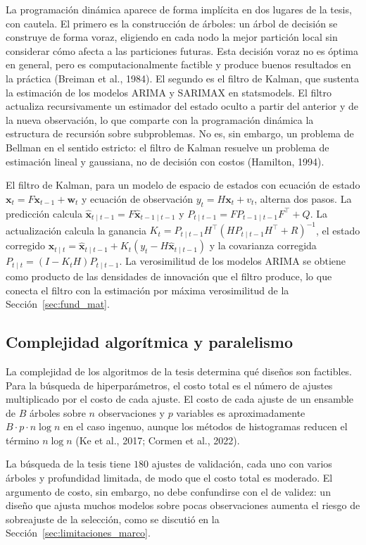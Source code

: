 La programación dinámica aparece de forma implícita en dos lugares de la tesis, con cautela. El primero es la construcción de árboles: un árbol de decisión se construye de forma voraz, eligiendo en cada nodo la mejor partición local sin considerar cómo afecta a las particiones futuras. Esta decisión voraz no es óptima en general, pero es computacionalmente factible y produce buenos resultados en la práctica (Breiman et al., 1984). El segundo es el filtro de Kalman, que sustenta la estimación de los modelos ARIMA y SARIMAX en statsmodels. El filtro actualiza recursivamente un estimador del estado oculto a partir del anterior y de la nueva observación, lo que comparte con la programación dinámica la estructura de recursión sobre subproblemas. No es, sin embargo, un problema de Bellman en el sentido estricto: el filtro de Kalman resuelve un problema de estimación lineal y gaussiana, no de decisión con costos (Hamilton, 1994).

El filtro de Kalman, para un modelo de espacio de estados con ecuación de estado $\mathbf{x}_t=F\mathbf{x}_{t-1}+\mathbf{w}_t$ y ecuación de observación $y_t=H\mathbf{x}_t+v_t$, alterna dos pasos. La predicción calcula $\hat{\mathbf{x}}_{t\mid t-1}=F\hat{\mathbf{x}}_{t-1\mid t-1}$ y $P_{t\mid t-1}=FP_{t-1\mid t-1}F^\top+Q$. La actualización calcula la ganancia $K_t=P_{t\mid t-1}H^\top(HP_{t\mid t-1}H^\top+R)^{-1}$, el estado corregido $\hat{\mathbf{x}}_{t\mid t}=\hat{\mathbf{x}}_{t\mid t-1}+K_t(y_t-H\hat{\mathbf{x}}_{t\mid t-1})$ y la covarianza corregida $P_{t\mid t}=(I-K_tH)P_{t\mid t-1}$. La verosimilitud de los modelos ARIMA se obtiene como producto de las densidades de innovación que el filtro produce, lo que conecta el filtro con la estimación por máxima verosimilitud de la Sección~\ref{sec:fund_mat}.

\subsection{Complejidad algorítmica y paralelismo}
La complejidad de los algoritmos de la tesis determina qué diseños son factibles. Para la búsqueda de hiperparámetros, el costo total es el número de ajustes multiplicado por el costo de cada ajuste. El costo de cada ajuste de un ensamble de $B$ árboles sobre $n$ observaciones y $p$ variables es aproximadamente $B\cdot p\cdot n\log n$ en el caso ingenuo, aunque los métodos de histogramas reducen el término $n\log n$ (Ke et al., 2017; Cormen et al., 2022).

La búsqueda de la tesis tiene $180$ ajustes de validación, cada uno con varios árboles y profundidad limitada, de modo que el costo total es moderado. El argumento de costo, sin embargo, no debe confundirse con el de validez: un diseño que ajusta muchos modelos sobre pocas observaciones aumenta el riesgo de sobreajuste de la selección, como se discutió en la Sección~\ref{sec:limitaciones_marco}.


